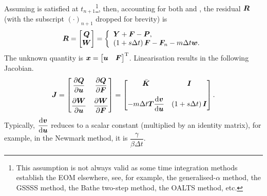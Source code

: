 Assuming  is satisfied at $t_{n+1}$\footnote{This assumption is not always valid as some time integration methods establish the EOM elsewhere, see, for example, the generalised-$\alpha$ method, the GSSSS method, the Bathe two-step method, the OALTS method, etc.}, then, accounting for both  and , the residual $\bm{R}$ (with the subscript $\left(\cdot\right)_{n+1}$ dropped for brevity) is
\begin{gather}
\bm{R}=\begin{bmatrix}
\bm{Q}\\\bm{W}
\end{bmatrix}=\left\{
\begin{array}{l}
\bm{Y}+\bm{F}-\bm{P},\\
\left(1+s\Delta{}t\right)\bm{F}-\bm{F}_n-m\Delta{}t\bm{w}.
\end{array}
\right.
\end{gather}
The unknown quantity is $\bm{x}=\begin{bmatrix}
\bm{u}&\bm{F}
\end{bmatrix}^{\mathrm{T}}$. Linearisation results in the following Jacobian.
\begin{gather}
\bm{J}=\begin{bmatrix}
\dfrac{\partial{\bm{Q}}}{\partial{\bm{u}}}&\dfrac{\partial{\bm{Q}}}{\partial{\bm{F}}}\\[4mm]
\dfrac{\partial{\bm{W}}}{\partial{\bm{u}}}&\dfrac{\partial{\bm{W}}}{\partial{\bm{F}}}
\end{bmatrix}=\begin{bmatrix}
\bar{\bm{K}}&\bm{I}\\[4mm]
-m\Delta{}t\bm{T}\dfrac{\mathrm{d}\bm{v}}{\mathrm{d}\bm{u}}&\left(1+s\Delta{}t\right)\bm{I}
\end{bmatrix}.
\end{gather}
Typically, $\dfrac{\mathrm{d}\bm{v}}{\mathrm{d}\bm{u}}$ reduces to a scalar constant (multiplied by an identity matrix), for example, in the Newmark method, it is $\dfrac{\gamma}{\beta\Delta{}t}$.

